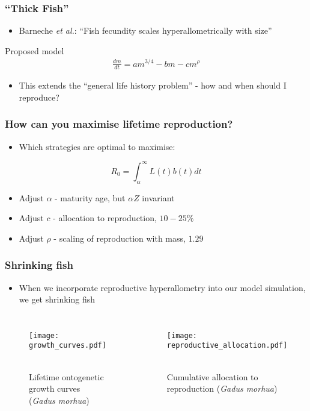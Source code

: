 \documentclass[handout]{beamer}
\begin{document}
\begin{frame}
	\frametitle{``Thick Fish''}
	\begin{itemize}
		\item Barneche \textit{et al.}: ``Fish fecundity scales hyperallometrically with size''
	\end{itemize}
	\begin{block}{Proposed model}
		\begin{align*}
			\frac{dm}{dt} = am^{3/4} - bm - cm^{\rho}
		\end{align*}
	\end{block}
	\begin{itemize}
		\item This extends the ``general life history problem'' - how and when should I reproduce?
	\end{itemize}
\end{frame}

\begin{frame}
	\frametitle{How can you maximise lifetime reproduction?}
	\begin{itemize}
		\item Which strategies are optimal to maximise:
	\end{itemize}
	\begin{equation*}
		R_0 = \int_{\alpha}^{\infty}L(t)b(t) dt
	\end{equation*}
	\begin{itemize}
		\item Adjust $\alpha$ - maturity age, but $\alpha Z$ invariant
		\item Adjust $c$ - allocation to reproduction, $10-25\%$
		\item Adjust $\rho$ - scaling of reproduction with mass, $1.29$
	\end{itemize}
\end{frame}

\begin{frame}
	\frametitle{Shrinking fish}
	\begin{itemize}
		\item When we incorporate reproductive hyperallometry into our model simulation, we get shrinking fish
	\end{itemize}
	\begin{columns}[b]
			\centering
			\begin{figure}
				\texttt{[image: growth\_curves.pdf]} \
				\caption{Lifetime ontogenetic growth curves (\textit{Gadus morhua})}
			\end{figure}
			\centering
			\begin{figure}
				\texttt{[image: reproductive\_allocation.pdf]} \
				\caption{Cumulative allocation to reproduction (\textit{Gadus morhua})}
			\end{figure}
		\column{0.0125\textwidth}
	\end{columns}
\end{frame}
\end{document}
